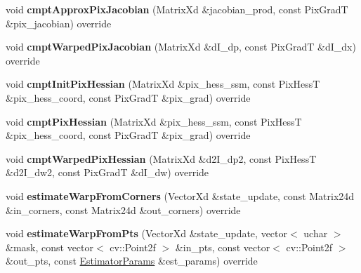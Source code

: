 \begin{DoxyCompactItemize}
\item 
\hypertarget{classTranscaling_a2c3ddd830478b5b88473f016fcec9045}{void {\bfseries cmpt\-Approx\-Pix\-Jacobian} (Matrix\-Xd \&jacobian\-\_\-prod, const Pix\-Grad\-T \&pix\-\_\-jacobian) override}\label{classTranscaling_a2c3ddd830478b5b88473f016fcec9045}

\item 
\hypertarget{classTranscaling_a2a40dab27ed333912405407bc57d5146}{void {\bfseries cmpt\-Warped\-Pix\-Jacobian} (Matrix\-Xd \&d\-I\-\_\-dp, const Pix\-Grad\-T \&d\-I\-\_\-dx) override}\label{classTranscaling_a2a40dab27ed333912405407bc57d5146}

\item 
\hypertarget{classTranscaling_ae2f69ec541f30c662852b67dfe776280}{void {\bfseries cmpt\-Init\-Pix\-Hessian} (Matrix\-Xd \&pix\-\_\-hess\-\_\-ssm, const Pix\-Hess\-T \&pix\-\_\-hess\-\_\-coord, const Pix\-Grad\-T \&pix\-\_\-grad) override}\label{classTranscaling_ae2f69ec541f30c662852b67dfe776280}

\item 
\hypertarget{classTranscaling_ac6dedd9d0d6c3db475b5ef6c58166ea8}{void {\bfseries cmpt\-Pix\-Hessian} (Matrix\-Xd \&pix\-\_\-hess\-\_\-ssm, const Pix\-Hess\-T \&pix\-\_\-hess\-\_\-coord, const Pix\-Grad\-T \&pix\-\_\-grad) override}\label{classTranscaling_ac6dedd9d0d6c3db475b5ef6c58166ea8}

\item 
\hypertarget{classTranscaling_ad86832a909e99feeb38399dd434952f0}{void {\bfseries cmpt\-Warped\-Pix\-Hessian} (Matrix\-Xd \&d2\-I\-\_\-dp2, const Pix\-Hess\-T \&d2\-I\-\_\-dw2, const Pix\-Grad\-T \&d\-I\-\_\-dw) override}\label{classTranscaling_ad86832a909e99feeb38399dd434952f0}

\item 
\hypertarget{classTranscaling_a64aac240bad542bedc89afa56f98d856}{void {\bfseries estimate\-Warp\-From\-Corners} (Vector\-Xd \&state\-\_\-update, const Matrix24d \&in\-\_\-corners, const Matrix24d \&out\-\_\-corners) override}\label{classTranscaling_a64aac240bad542bedc89afa56f98d856}

\item 
\hypertarget{classTranscaling_abd898650758a493f2188dd772e7a49ed}{void {\bfseries estimate\-Warp\-From\-Pts} (Vector\-Xd \&state\-\_\-update, vector$<$ uchar $>$ \&mask, const vector$<$ cv\-::\-Point2f $>$ \&in\-\_\-pts, const vector$<$ cv\-::\-Point2f $>$ \&out\-\_\-pts, const \hyperlink{structSSMEstimatorParams}{Estimator\-Params} \&est\-\_\-params) override}\label{classTranscaling_abd898650758a493f2188dd772e7a49ed}


\end{DoxyCompactItemize}
